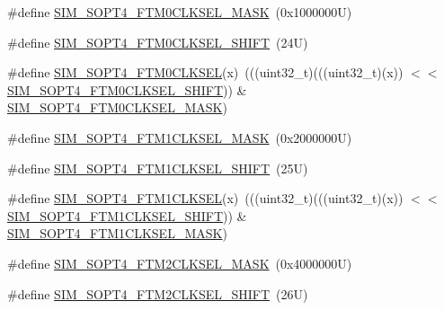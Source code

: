 \begin{DoxyCompactItemize}
\item 
\#define \mbox{\hyperlink{group___s_i_m___register___masks_gaac823c598ac790d9eeeeb7ddb86d1657}{S\+I\+M\+\_\+\+S\+O\+P\+T4\+\_\+\+F\+T\+M0\+C\+L\+K\+S\+E\+L\+\_\+\+M\+A\+SK}}~(0x1000000\+U)
\item 
\#define \mbox{\hyperlink{group___s_i_m___register___masks_ga77c42e9023c3ed2d759431e2c072860f}{S\+I\+M\+\_\+\+S\+O\+P\+T4\+\_\+\+F\+T\+M0\+C\+L\+K\+S\+E\+L\+\_\+\+S\+H\+I\+FT}}~(24\+U)
\item 
\#define \mbox{\hyperlink{group___s_i_m___register___masks_gacc02c7283a010f29424df7839fec1d36}{S\+I\+M\+\_\+\+S\+O\+P\+T4\+\_\+\+F\+T\+M0\+C\+L\+K\+S\+EL}}(x)~(((uint32\+\_\+t)(((uint32\+\_\+t)(x)) $<$$<$ \mbox{\hyperlink{group___s_i_m___register___masks_ga77c42e9023c3ed2d759431e2c072860f}{S\+I\+M\+\_\+\+S\+O\+P\+T4\+\_\+\+F\+T\+M0\+C\+L\+K\+S\+E\+L\+\_\+\+S\+H\+I\+FT}})) \& \mbox{\hyperlink{group___s_i_m___register___masks_gaac823c598ac790d9eeeeb7ddb86d1657}{S\+I\+M\+\_\+\+S\+O\+P\+T4\+\_\+\+F\+T\+M0\+C\+L\+K\+S\+E\+L\+\_\+\+M\+A\+SK}})
\item 
\#define \mbox{\hyperlink{group___s_i_m___register___masks_ga0cd5cb92a9ea79e8227693c793ee5983}{S\+I\+M\+\_\+\+S\+O\+P\+T4\+\_\+\+F\+T\+M1\+C\+L\+K\+S\+E\+L\+\_\+\+M\+A\+SK}}~(0x2000000\+U)
\item 
\#define \mbox{\hyperlink{group___s_i_m___register___masks_ga04492b54a5b581b3bdef8568bdbabf91}{S\+I\+M\+\_\+\+S\+O\+P\+T4\+\_\+\+F\+T\+M1\+C\+L\+K\+S\+E\+L\+\_\+\+S\+H\+I\+FT}}~(25\+U)
\item 
\#define \mbox{\hyperlink{group___s_i_m___register___masks_ga5a518f1f4c7c7dc592e6b69bba80b68b}{S\+I\+M\+\_\+\+S\+O\+P\+T4\+\_\+\+F\+T\+M1\+C\+L\+K\+S\+EL}}(x)~(((uint32\+\_\+t)(((uint32\+\_\+t)(x)) $<$$<$ \mbox{\hyperlink{group___s_i_m___register___masks_ga04492b54a5b581b3bdef8568bdbabf91}{S\+I\+M\+\_\+\+S\+O\+P\+T4\+\_\+\+F\+T\+M1\+C\+L\+K\+S\+E\+L\+\_\+\+S\+H\+I\+FT}})) \& \mbox{\hyperlink{group___s_i_m___register___masks_ga0cd5cb92a9ea79e8227693c793ee5983}{S\+I\+M\+\_\+\+S\+O\+P\+T4\+\_\+\+F\+T\+M1\+C\+L\+K\+S\+E\+L\+\_\+\+M\+A\+SK}})
\item 
\#define \mbox{\hyperlink{group___s_i_m___register___masks_ga8e9ace9af53ead470265ca2338402dae}{S\+I\+M\+\_\+\+S\+O\+P\+T4\+\_\+\+F\+T\+M2\+C\+L\+K\+S\+E\+L\+\_\+\+M\+A\+SK}}~(0x4000000\+U)
\item 
\#define \mbox{\hyperlink{group___s_i_m___register___masks_ga4b5b8e4dc00734623d8a16db8ff0510c}{S\+I\+M\+\_\+\+S\+O\+P\+T4\+\_\+\+F\+T\+M2\+C\+L\+K\+S\+E\+L\+\_\+\+S\+H\+I\+FT}}~(26\+U)
\item 

\end{DoxyCompactItemize}
